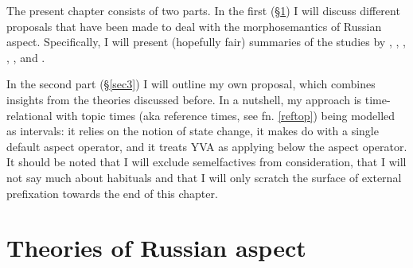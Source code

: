 \documentclass[output=paper,colorlinks,citecolor=brown]{langscibook}
\begin{document}
\noindent The present chapter consists of two parts. In the first (\S\ref{sec2}) I will discuss different proposals that have been made to deal with the morphosemantics of Russian aspect. Specifically, I will present (hopefully fair) summaries of the studies by \citet{Zucchi1999}, \citet{Gronn08}, \citet{Filip2000,Filip2008}, \citet{Altshuler2014}, \citet{Tatevosov2011, Tate15, Tate17}, \citet{Bohne2004} and \citet{Ramchand2004, Ramchand08}.  

In the second part (\S\ref{sec3}) I will outline my own proposal, which combines insights from the theories discussed before. In a nutshell, my approach is time-relational with topic times (aka reference times, see fn. \ref{reftop}) being modelled as intervals: it relies on the notion of state change, it makes do with a single default aspect operator, and it treats YVA as applying below the aspect operator. 
It should be noted that I will exclude semelfactives from consideration, that I will not say much about habituals and that I will only scratch the surface of external prefixation towards the end of this chapter. 
 
\section{Theories of Russian aspect} \label{sec2}
\end{document}
